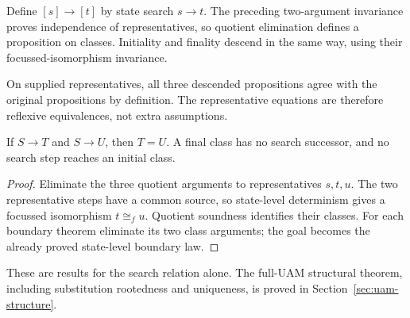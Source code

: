 \begin{definition}
Define $[s]\longrightarrow[t]$ by state search $s\longrightarrow t$.
The preceding two-argument invariance proves independence of representatives,
so quotient elimination defines a proposition on classes. Initiality and
finality descend in the same way, using their focussed-isomorphism invariance.
\end{definition}
On supplied representatives, all three descended propositions agree with the
original propositions by definition. The representative equations are therefore
reflexive equivalences, not extra assumptions.

\begin{theorem}
If $S\longrightarrow T$ and $S\longrightarrow U$, then $T=U$.
A final class has no search successor, and no search step reaches an initial
class.
\end{theorem}
\begin{proof}
Eliminate the three quotient arguments to representatives $s,t,u$.
The two representative steps have a common source, so state-level determinism
gives a focussed isomorphism $t\cong_f u$. Quotient soundness identifies their
classes. For each boundary theorem eliminate its two class arguments;
the goal becomes the already proved state-level boundary law.
\end{proof}
These are results for the search relation alone. The full-UAM structural
theorem, including substitution rootedness and uniqueness, is proved in
Section~\ref{sec:uam-structure}.

